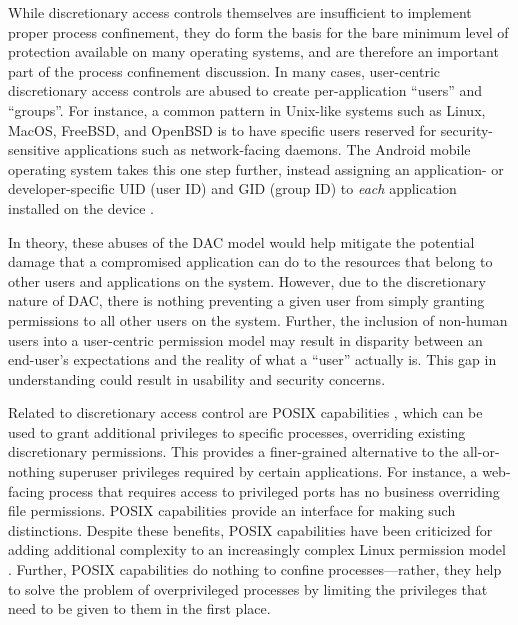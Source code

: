 \documentclass[dvipsnames, 12pt]{article}
\begin{document}
While discretionary access controls themselves are insufficient to implement
proper process confinement, they do form the basis for the bare minimum level of
protection available on many operating systems, and are therefore an important
part of the process confinement discussion. In many cases, user-centric
discretionary access controls are abused to create per-application
\enquote{users} and \enquote{groups}. For instance, a common pattern in
Unix-like systems such as Linux, MacOS, FreeBSD, and OpenBSD is to have specific
users reserved for security-sensitive applications such as network-facing
daemons. The Android mobile operating system takes this one step further,
instead assigning an application- or developer-specific UID (user ID) and GID
(group ID) to \textit{each} application installed on the device
\cite{android_security}.

In theory, these abuses of the DAC model would help mitigate the potential
damage that a compromised application can do to the resources that belong to
other users and applications on the system. However, due to the discretionary
nature of DAC, there is nothing preventing a given user from simply granting
permissions to all other users on the system. Further, the inclusion of
non-human users into a user-centric permission model may result in disparity
between an end-user's expectations and the reality of what a \enquote{user}
actually is. This gap in understanding could result in usability and security
concerns.

Related to discretionary access control are POSIX capabilities
\cite{posix_capabilities,corbet2006_capabities_a,corbet2006_capabities_b}, which
can be used to grant additional privileges to specific processes, overriding
existing discretionary permissions. This provides a finer-grained alternative to
the all-or-nothing superuser privileges required by certain applications. For
instance, a web-facing process that requires access to privileged ports has no
business overriding file permissions. POSIX capabilities provide an interface
for making such distinctions. Despite these benefits, POSIX capabilities have
been criticized for adding additional complexity to an increasingly complex
Linux permission model \cite{corbet2006_capabities_b,corbet2006_capabities_a}.
Further, POSIX capabilities do nothing to confine processes---rather, they help
to solve the problem of overprivileged processes by limiting the privileges that
need to be given to them in the first place.
\end{document}
